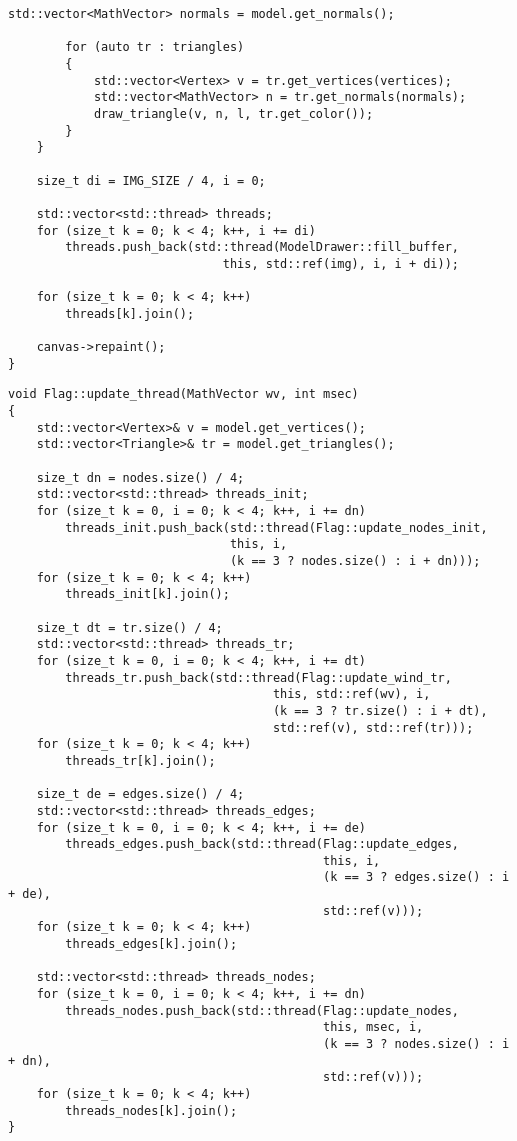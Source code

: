 \begin{lstlisting}[caption=Функция отрисовки сцены, label=list:draw_model]
		std::vector<MathVector> normals = model.get_normals();
		
		for (auto tr : triangles)
		{
			std::vector<Vertex> v = tr.get_vertices(vertices);
			std::vector<MathVector> n = tr.get_normals(normals);
			draw_triangle(v, n, l, tr.get_color());
		}
	}
	
	size_t di = IMG_SIZE / 4, i = 0;
	
	std::vector<std::thread> threads;
	for (size_t k = 0; k < 4; k++, i += di)
		threads.push_back(std::thread(ModelDrawer::fill_buffer,
							  this, std::ref(img), i, i + di));
	
	for (size_t k = 0; k < 4; k++)
		threads[k].join();
	
	canvas->repaint();
}
\end{lstlisting}

\begin{lstlisting}[caption=Функция обновления положения точки флага, label=list:update]
void Flag::update_thread(MathVector wv, int msec)
{
	std::vector<Vertex>& v = model.get_vertices();
	std::vector<Triangle>& tr = model.get_triangles();
	
	size_t dn = nodes.size() / 4;
	std::vector<std::thread> threads_init;
	for (size_t k = 0, i = 0; k < 4; k++, i += dn)
		threads_init.push_back(std::thread(Flag::update_nodes_init,
							   this, i,
							   (k == 3 ? nodes.size() : i + dn)));
	for (size_t k = 0; k < 4; k++)
		threads_init[k].join();
	
	size_t dt = tr.size() / 4;
	std::vector<std::thread> threads_tr;
	for (size_t k = 0, i = 0; k < 4; k++, i += dt)
		threads_tr.push_back(std::thread(Flag::update_wind_tr,
									 this, std::ref(wv), i,
									 (k == 3 ? tr.size() : i + dt),
									 std::ref(v), std::ref(tr)));
	for (size_t k = 0; k < 4; k++)
		threads_tr[k].join();
	
	size_t de = edges.size() / 4;
	std::vector<std::thread> threads_edges;
	for (size_t k = 0, i = 0; k < 4; k++, i += de)
		threads_edges.push_back(std::thread(Flag::update_edges,
											this, i,
											(k == 3 ? edges.size() : i + de),
											std::ref(v)));
	for (size_t k = 0; k < 4; k++)
		threads_edges[k].join();
	
	std::vector<std::thread> threads_nodes;
	for (size_t k = 0, i = 0; k < 4; k++, i += dn)
		threads_nodes.push_back(std::thread(Flag::update_nodes,
											this, msec, i,
											(k == 3 ? nodes.size() : i + dn),
											std::ref(v)));
	for (size_t k = 0; k < 4; k++)
		threads_nodes[k].join();
}
\end{lstlisting}

